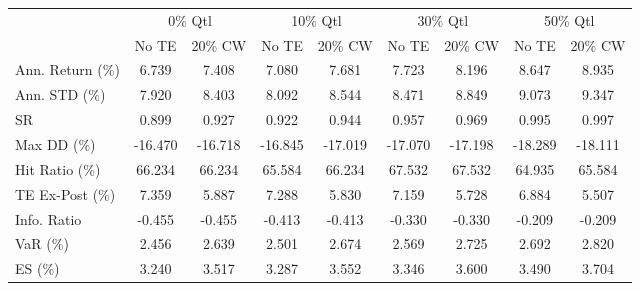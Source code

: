 \begin{tabular}{lcccccccc}
\toprule
{} & \multicolumn{2}{c}{0\% Qtl} & \multicolumn{2}{c}{10\% Qtl} & \multicolumn{2}{c}{30\% Qtl} & \multicolumn{2}{c}{50\% Qtl} \\
{} &   No TE &  20\% CW &   No TE &  20\% CW &   No TE &  20\% CW &   No TE &  20\% CW \\
\midrule
Ann. Return (\%) &   6.739 &   7.408 &   7.080 &   7.681 &   7.723 &   8.196 &   8.647 &   8.935 \\
Ann. STD (\%)    &   7.920 &   8.403 &   8.092 &   8.544 &   8.471 &   8.849 &   9.073 &   9.347 \\
SR              &   0.899 &   0.927 &   0.922 &   0.944 &   0.957 &   0.969 &   0.995 &   0.997 \\
Max DD (\%)      & -16.470 & -16.718 & -16.845 & -17.019 & -17.070 & -17.198 & -18.289 & -18.111 \\
Hit Ratio (\%)   &  66.234 &  66.234 &  65.584 &  66.234 &  67.532 &  67.532 &  64.935 &  65.584 \\
TE Ex-Post (\%)  &   7.359 &   5.887 &   7.288 &   5.830 &   7.159 &   5.728 &   6.884 &   5.507 \\
Info. Ratio     &  -0.455 &  -0.455 &  -0.413 &  -0.413 &  -0.330 &  -0.330 &  -0.209 &  -0.209 \\
VaR (\%)         &   2.456 &   2.639 &   2.501 &   2.674 &   2.569 &   2.725 &   2.692 &   2.820 \\
ES (\%)          &   3.240 &   3.517 &   3.287 &   3.552 &   3.346 &   3.600 &   3.490 &   3.704 \\
\bottomrule
\end{tabular}
